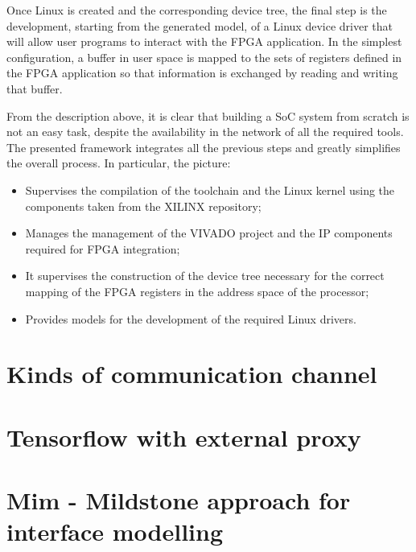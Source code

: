 Once Linux is created and the corresponding device tree, the final step is the development, starting from the generated model, of a Linux device driver that will allow user programs to interact with the FPGA application. In the simplest configuration, a buffer in user space is mapped to the sets of registers defined in the FPGA application so that information is exchanged by reading and writing that buffer.

From the description above, it is clear that building a SoC system from scratch is not an easy task, despite the availability in the network of all the required tools. The presented framework integrates all the previous steps and greatly simplifies the overall process. In particular, the picture:
\begin{itemize}
    \item Supervises the compilation of the toolchain and the Linux kernel using the components taken from the XILINX repository;
    \item Manages the management of the VIVADO project and the IP components required for FPGA integration;
    \item It supervises the construction of the device tree necessary for the correct mapping of the FPGA registers in the address space of the processor;
    \item Provides models for the development of the required Linux drivers.
\end{itemize}





\section{Kinds of communication channel}

\section{Tensorflow with external proxy}

\section{Mim - Mildstone approach for interface modelling}
